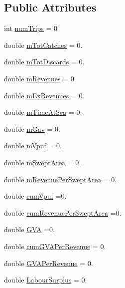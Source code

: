 \subsection*{Public Attributes}
\begin{DoxyCompactItemize}
\item 
int \mbox{\hyperlink{class_nation_stats_a6a49e465cf0ffb61ff4f96f5cf6f39c0}{num\+Trips}} = 0
\item 
double \mbox{\hyperlink{class_nation_stats_a3f5ebc21862c1fafdb1b3985c9822549}{m\+Tot\+Catches}} = 0.
\item 
double \mbox{\hyperlink{class_nation_stats_a5bfcb4c0cf0541f031bff7435e9be7a1}{m\+Tot\+Discards}} = 0.
\item 
double \mbox{\hyperlink{class_nation_stats_abb66d32bfab1061acb8a8d189c331b34}{m\+Revenues}} = 0.
\item 
double \mbox{\hyperlink{class_nation_stats_a9830e4e1d397350bf6887622d7d82bf3}{m\+Ex\+Revenues}} = 0.
\item 
double \mbox{\hyperlink{class_nation_stats_a317d25a33e3f42240bfbe87acd37db6a}{m\+Time\+At\+Sea}} = 0.
\item 
double \mbox{\hyperlink{class_nation_stats_ad86b03158d3d567809ac3bf6bfce6829}{m\+Gav}} = 0.
\item 
double \mbox{\hyperlink{class_nation_stats_a41eaab821975dd76cef85e201d997ed3}{m\+Vpuf}} = 0.
\item 
double \mbox{\hyperlink{class_nation_stats_abd6eb80a1ef644720ed8de62ad1391cf}{m\+Swept\+Area}} = 0.
\item 
double \mbox{\hyperlink{class_nation_stats_a4f1d4ef599f977eb7b6868fab65c19b2}{m\+Revenue\+Per\+Swept\+Area}} = 0.
\item 
double \mbox{\hyperlink{class_nation_stats_a02a1989ae1104d273b455d8c1089ffd8}{cum\+Vpuf}} =0.
\item 
double \mbox{\hyperlink{class_nation_stats_adf1f89022cdd3273fc1b175b361942fb}{cum\+Revenue\+Per\+Swept\+Area}} =0.
\item 
double \mbox{\hyperlink{class_nation_stats_aeeafd4ba2d70b59098d33a3297d9a690}{G\+VA}} =0.
\item 
double \mbox{\hyperlink{class_nation_stats_af819ca4223babdb7c10544e91b1af3e9}{cum\+G\+V\+A\+Per\+Revenue}} = 0.
\item 
double \mbox{\hyperlink{class_nation_stats_ab47aebe89c6b86aac7f8ef3045ffc943}{G\+V\+A\+Per\+Revenue}} = 0.
\item 
double \mbox{\hyperlink{class_nation_stats_a3b0b13ff77d00017f9535b29adc6d0bf}{Labour\+Surplus}} = 0.

\end{DoxyCompactItemize}
